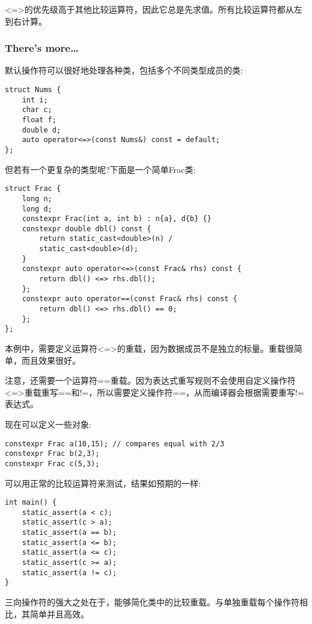 \begin{tcolorbox}[colback=webgreen!5!white,colframe=webgreen!75!black,title=Note]
<=>的优先级高于其他比较运算符，因此它总是先求值。所有比较运算符都从左到右计算。
\end{tcolorbox}

\subsubsection{There's more…}

默认操作符可以很好地处理各种类，包括多个不同类型成员的类:

\begin{lstlisting}[style=styleCXX]
struct Nums {
	int i;
	char c;
	float f;
	double d;
	auto operator<=>(const Nums&) const = default;
};
\end{lstlisting}

但若有一个更复杂的类型呢?下面是一个简单Frac类:

\begin{lstlisting}[style=styleCXX]
struct Frac {
	long n;
	long d;
	constexpr Frac(int a, int b) : n{a}, d{b} {}
	constexpr double dbl() const {
		return static_cast<double>(n) /
		static_cast<double>(d);
	}
	constexpr auto operator<=>(const Frac& rhs) const {
		return dbl() <=> rhs.dbl();
	};
	constexpr auto operator==(const Frac& rhs) const {
		return dbl() <=> rhs.dbl() == 0;
	};
};
\end{lstlisting}

本例中，需要定义运算符<=>的重载，因为数据成员不是独立的标量。重载很简单，而且效果很好。

注意，还需要一个运算符==重载。因为表达式重写规则不会使用自定义操作符<=>重载重写==和!=，所以需要定义操作符==，从而编译器会根据需要重写!=表达式。

现在可以定义一些对象:

\begin{lstlisting}[style=styleCXX]
constexpr Frac a(10,15); // compares equal with 2/3
constexpr Frac b(2,3);
constexpr Frac c(5,3);
\end{lstlisting}

可以用正常的比较运算符来测试，结果如预期的一样:

\begin{lstlisting}[style=styleCXX]
int main() {
	static_assert(a < c);
	static_assert(c > a);
	static_assert(a == b);
	static_assert(a <= b);
	static_assert(a <= c);
	static_assert(c >= a);
	static_assert(a != c);
}
\end{lstlisting}

三向操作符的强大之处在于，能够简化类中的比较重载。与单独重载每个操作符相比，其简单并且高效。
















